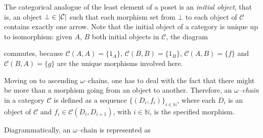 The categorical analogue of the least element of a poset is an \emph{initial object}, that is, an object \(\bot \in \lvert \mathcal{C} \rvert\) such that each morphism set from \(\bot\) to each object of \(\mathcal{C}\) contains exactly one arrow.%
Note that the initial object of a category is unique up to isomorphism: given \(A\), \(B\) both initial objects in \(\mathcal{C}\), the diagram
\begin{center}
\end{center}
commutes, because \(\mathcal{C}(A,A) = \lbrace 1_A \rbrace\), \(\mathcal{C}(B,B) = \lbrace 1_B \rbrace\), \(\mathcal{C}(A,B) = \lbrace f \rbrace\) and \(\mathcal{C}(B,A) = \lbrace g \rbrace\) are the unique morphisms involved here.%


Moving on to ascending \(\omega\)--chains, one has to deal with the fact that there might be more than a morphism going from an object to another. %
Therefore, an \emph{\(\omega\)--chain} in a category \(\mathcal{C}\) is defined as a sequence \(\lbrace (D_i,f_i) \rbrace_{i \in \mathbb{N}}\), where each \(D_i\) is an object of \(\mathcal{C}\) and \(f_i \in \mathcal{C}(D_i, D_{i+1})\), with \(i \in \mathbb{N}\), is the specified morphism.%

Diagrammatically, an \(\omega{}\)--chain is represented as
\begin{center}
\end{center}

